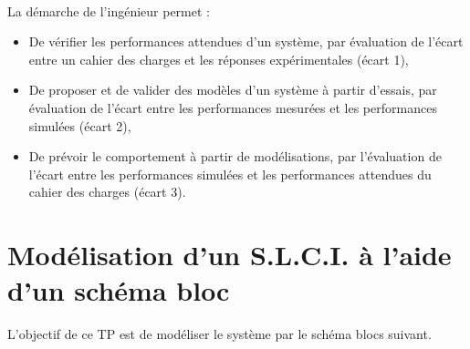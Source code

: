 



 \\

\graphicspath{{../../img/}}
\begin{center}
\def\svgwidth{\columnwidth}

\end{center}

La démarche de l’ingénieur permet :
\begin{itemize}
 \item De vérifier les performances attendues d’un système, par évaluation de l’écart entre un cahier des charges et les réponses expérimentales (écart 1),
 \item De proposer et de valider des modèles d’un système à partir d’essais, par évaluation de l’écart entre les performances mesurées et les performances simulées (écart 2),
 \item De prévoir le comportement à partir de modélisations, par l’évaluation de l’écart entre les performances simulées et les performances attendues du cahier des charges (écart 3).
\end{itemize}


\newpage

\section{Modélisation d'un S.L.C.I. à l'aide d'un schéma bloc} 


L'objectif de ce TP est de modéliser le système par le schéma blocs suivant.

\graphicspath{{"../../Systemes/\systemes/"}}

\begin{center}
\def\svgwidth{\columnwidth}

\end{center}


